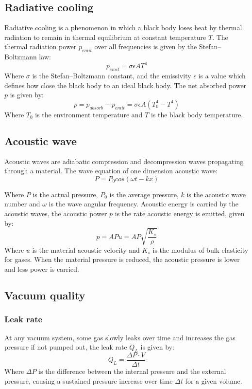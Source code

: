 \documentclass[\main/master.tex]{subfiles}
\begin{document}
\subsection{Radiative cooling}
Radiative cooling is a phenomenon in which a black body loses heat by thermal radiation to remain in thermal equilibrium at constant temperature $T$. The thermal radiation power $p_{emit}$ over all frequencies is given by the Stefan–Boltzmann law:
\begin{equation}
p_{emit} = \sigma\epsilon A T^4  \label{eqn: Stefan–Boltzmann law}
\end{equation}
Where $\sigma$ is the Stefan–Boltzmann constant, and the emissivity $\epsilon$ is a value which defines how close the black body to an ideal black body. The net absorbed power $p$ is given by: 
\begin{equation}
p = p_{absorb}-p_{emit} = \sigma\epsilon A (T_0^4-T^4)  \label{eqn: Stefan–Boltzmann power}
\end{equation}
Where $T_0$ is the environment temperature and $T$ is the black body temperature.  
\subsection{Acoustic wave}
Acoustic waves are adiabatic compression and decompression waves propagating through a material. The wave equation of one dimension acoustic wave:
\begin{equation}
P = P_0 cos(\omega t -k x)       \label{eqn:acoustic_pressure}
\end{equation}
\par\noindent
Where $P$ is the actual pressure, $P_0$ is the average pressure, $k$ is the acoustic wave number and $\omega$ is the wave angular frequency. Acoustic energy is carried by the acoustic waves, the acoustic power $p$ is the rate acoustic energy is emitted, given by:
\begin{equation}
p = AP u  = A P\sqrt{\frac{K_s}{\rho}}     \label{eqn:acoustic_intensity}
\end{equation}
Where $u$ is the material acoustic velocity and $K_s$ is the modulus of bulk elasticity for gases. When the material pressure is reduced, the acoustic pressure is lower and less power is carried.


\subsection{Vacuum quality}
\subsubsection{Leak rate}
At any vacuum system, some gas slowly leaks over time and increases the gas pressure if not pumped out, the leak rate $Q_L$ is given by: 
\begin{equation}
Q_L = \frac{\Delta P\cdot V}{\Delta t}  \label{eqn:leak rate}
\end{equation}
Where $\Delta P$ is the difference between the internal pressure and the external pressure, causing a sustained pressure increase over time $\Delta t$ for a given volume.
\end{document}
